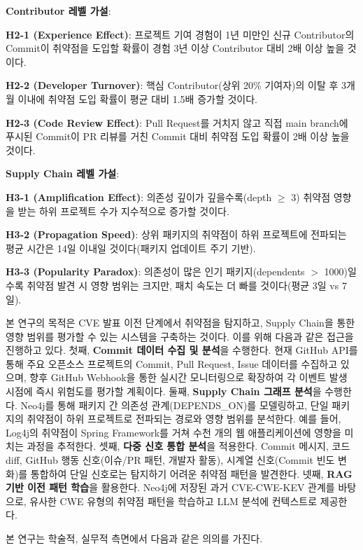 ﻿\documentclass[conference]{IEEEtran}
\begin{document}
\noindent\textbf{Contributor 레벨 가설}:

\noindent\textbf{H2-1 (Experience Effect)}: 프로젝트 기여 경험이 1년 미만인 신규 Contributor의 Commit이 취약점을 도입할 확률이 경험 3년 이상 Contributor 대비 2배 이상 높을 것이다.

\noindent\textbf{H2-2 (Developer Turnover)}: 핵심 Contributor(상위 20\% 기여자)의 이탈 후 3개월 이내에 취약점 도입 확률이 평균 대비 1.5배 증가할 것이다.

\noindent\textbf{H2-3 (Code Review Effect)}: Pull Request를 거치지 않고 직접 main branch에 푸시된 Commit이 PR 리뷰를 거친 Commit 대비 취약점 도입 확률이 2배 이상 높을 것이다.

\noindent\textbf{Supply Chain 레벨 가설}:

\noindent\textbf{H3-1 (Amplification Effect)}: 의존성 깊이가 깊을수록(depth $\geq$ 3) 취약점 영향을 받는 하위 프로젝트 수가 지수적으로 증가할 것이다.

\noindent\textbf{H3-2 (Propagation Speed)}: 상위 패키지의 취약점이 하위 프로젝트에 전파되는 평균 시간은 14일 이내일 것이다(패키지 업데이트 주기 기반).

\noindent\textbf{H3-3 (Popularity Paradox)}: 의존성이 많은 인기 패키지(dependents $>$ 1000)일수록 취약점 발견 시 영향 범위는 크지만, 패치 속도는 더 빠를 것이다(평균 3일 vs 7일).

\noindent\indent 본 연구의 목적은 CVE 발표 이전 단계에서 취약점을 탐지하고, Supply Chain을 통한 영향 범위를 평가할 수 있는 시스템을 구축하는 것이다. 이를 위해 다음과 같은 접근을 진행하고 있다. 첫째, \textbf{Commit 데이터 수집 및 분석}을 수행한다. 현재 GitHub API를 통해 주요 오픈소스 프로젝트의 Commit, Pull Request, Issue 데이터를 수집하고 있으며, 향후 GitHub Webhook을 통한 실시간 모니터링으로 확장하여 각 이벤트 발생 시점에 즉시 위험도를 평가할 계획이다. 둘째, \textbf{Supply Chain 그래프 분석}을 수행한다. Neo4j를 통해 패키지 간 의존성 관계(DEPENDS\_ON)를 모델링하고, 단일 패키지의 취약점이 하위 프로젝트로 전파되는 경로와 영향 범위를 분석한다. 예를 들어, Log4j의 취약점이 Spring Framework를 거쳐 수천 개의 웹 애플리케이션에 영향을 미치는 과정을 추적한다. 셋째, \textbf{다중 신호 통합 분석}을 적용한다. Commit 메시지, 코드 diff, GitHub 행동 신호(이슈/PR 패턴, 개발자 활동), 시계열 신호(Commit 빈도 변화)를 통합하여 단일 신호로는 탐지하기 어려운 취약점 패턴을 발견한다. 넷째, \textbf{RAG 기반 이전 패턴 학습}을 활용한다. Neo4j에 저장된 과거 CVE-CWE-KEV 관계를 바탕으로, 유사한 CWE 유형의 취약점 패턴을 학습하고 LLM 분석에 컨텍스트로 제공한다.

본 연구는 학술적, 실무적 측면에서 다음과 같은 의의를 가진다.
\end{document}
